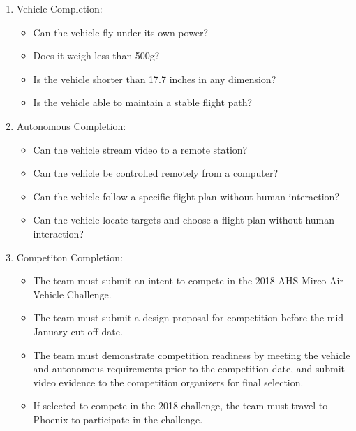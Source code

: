 \documentclass[onecolumn, draftclsnofoot,10pt, compsoc]{IEEEtran}
\begin{document}
\begin{enumerate}
\item Vehicle Completion:
\begin{itemize}
\item Can the vehicle fly under its own power?
\item Does it weigh less than 500g?
\item Is the vehicle shorter than 17.7 inches in any dimension?
\item Is the vehicle able to maintain a stable flight path?
\end{itemize}
\item Autonomous Completion:
\begin{itemize}
\item Can the vehicle stream video to a remote station?
\item Can the vehicle be controlled remotely from a computer?
\item Can the vehicle follow a specific flight plan without human interaction?
\item Can the vehicle locate targets and choose a flight plan without human
interaction?
\end{itemize}
\item Competiton Completion:
\begin{itemize}
\item The team must submit an intent to compete in the 2018 AHS Mirco-Air Vehicle
Challenge.
\item The team must submit a design proposal for competition before the mid-
January cut-off date.
\item The team must demonstrate competition readiness by meeting the vehicle and
autonomous requirements prior to the competition date, and submit video evidence
to the competition organizers for final selection.
\item If selected to compete in the 2018 challenge, the team must travel to
Phoenix to participate in the challenge.
\end{itemize}
\end{enumerate}






\end{document}
